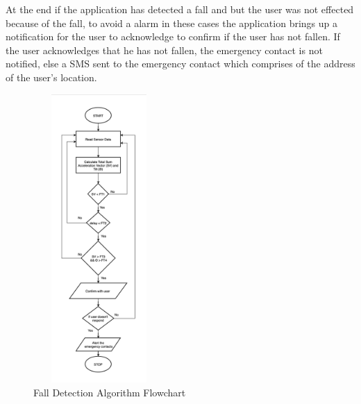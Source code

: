 \documentclass[conference]{IEEEtran}
\begin{document}
At the end if the application has detected a fall and but the user was not effected because of the fall, to avoid a alarm in these cases the application brings up a notification for the user to acknowledge to confirm if the user has not fallen. If the user acknowledges that he has not fallen, the emergency contact is not notified, else a SMS sent to the emergency contact which comprises of the address of the user's location. 
 
\begin{figure}
\centerline{\includegraphics[width=5cm, height=11cm]{Flowchart.png}}
\caption{Fall Detection Algorithm Flowchart}
\label{fig:fallDetectAlgo}
\end{figure}
\end{document}

